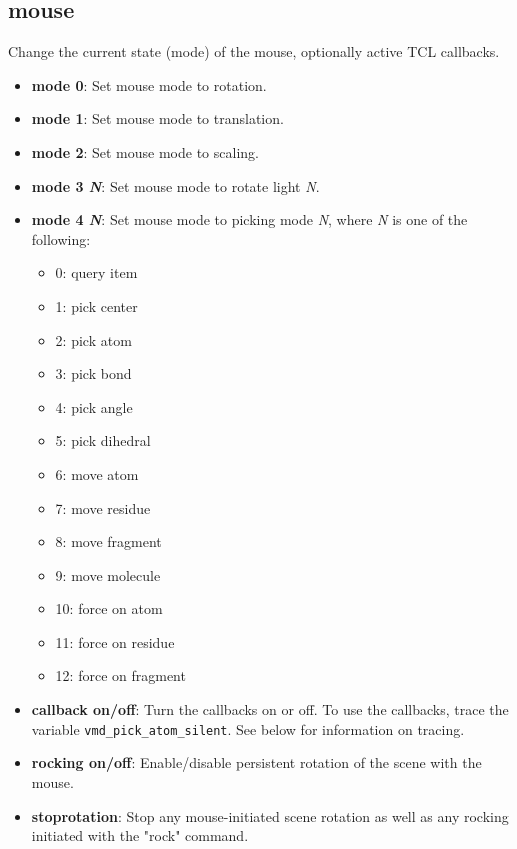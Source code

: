   \subsection{mouse}
Change the current state (mode) of the mouse, optionally active TCL
callbacks.
  \begin{itemize}
    \item {\bf mode 0}: Set mouse mode to rotation.
    \item {\bf mode 1}: Set mouse mode to translation.
    \item {\bf mode 2}: Set mouse mode to scaling.
    \item {\bf mode 3 {\it N}}: Set mouse mode to rotate light {\it N}.
    \item {\bf mode 4 {\it N}}: Set mouse mode to picking mode {\it N}, where
{\it N} is one of the following:
	\begin{itemize}
		\item 0: query item
		\item 1: pick center
		\item 2: pick atom
		\item 3: pick bond
		\item 4: pick angle
		\item 5: pick dihedral
		\item 6: move atom
		\item 7: move residue
		\item 8: move fragment
		\item 9: move molecule
		\item 10: force on atom
		\item 11: force on residue
		\item 12: force on fragment
	\end{itemize}
  \end{itemize}
  \begin{itemize}
    \item {\bf callback on/off}: Turn the callbacks on or off.  To
    use the callbacks, trace the variable \verb^vmd_pick_atom_silent^.
    See below for information on tracing.
    \item {\bf rocking on/off}: Enable/disable persistent rotation of the
    scene with the mouse.
    \item {\bf stoprotation}: Stop any mouse-initiated scene rotation as well
    as any rocking initiated with the "rock" command.
  \end{itemize}


